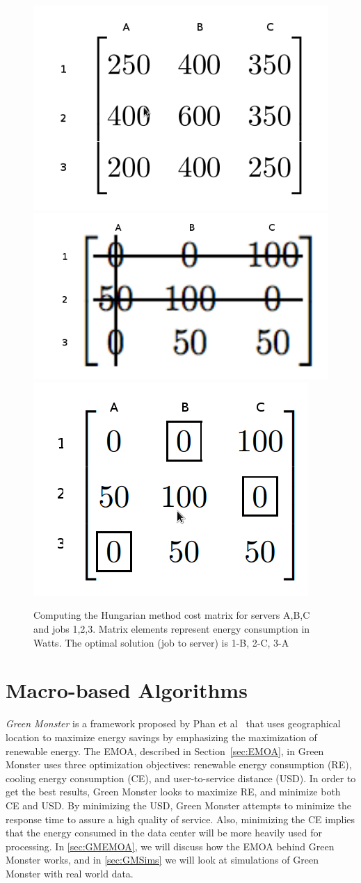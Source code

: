 \documentclass{sig-alternate}
\begin{document}
\begin{figure}[tb]
 \centering
 \includegraphics[height=0.25 \textwidth]{s}
 \includegraphics[height=0.20 \textwidth]{s2}
 \includegraphics[height=0.25 \textwidth]{s3}
 \caption{Computing the Hungarian method cost matrix for servers A,B,C and jobs 1,2,3. Matrix elements represent energy consumption in Watts. The optimal solution (job to server) is 1-B, 2-C, 3-A}
 \label{fig:HMA}
\end{figure}

\section{Macro-based Algorithms}
\label{sec:MacAl}

\emph{Green Monster} is a framework proposed by Phan et al~\cite{Phan} that uses geographical location to maximize energy savings by emphasizing the maximization of renewable energy. The EMOA, described in Section~\ref{sec:EMOA}, in Green Monster uses three optimization objectives: renewable energy consumption (RE), cooling energy consumption (CE), and user-to-service distance (USD). In order to get the best results, Green Monster looks to maximize RE, and minimize both CE and USD. By minimizing the USD, Green Monster attempts to minimize the response time to assure a high quality of service. Also, minimizing the CE implies that the energy consumed in the data center will be more heavily used for processing. In \ref{sec:GMEMOA}, we will discuss how the EMOA behind Green Monster works, and in \ref{sec:GMSims} we will look at simulations of Green Monster with real world data.
\end{document}
